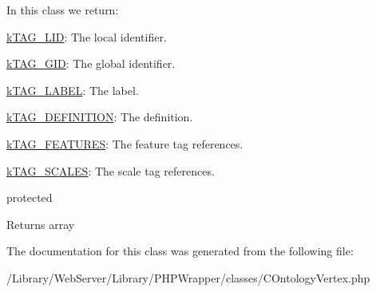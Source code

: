 In this class we return\-:


\begin{DoxyItemize}
\item {\ttfamily \hyperlink{}{k\-T\-A\-G\-\_\-\-L\-I\-D}}\-: The local identifier. 
\item {\ttfamily \hyperlink{}{k\-T\-A\-G\-\_\-\-G\-I\-D}}\-: The global identifier. 
\item {\ttfamily \hyperlink{}{k\-T\-A\-G\-\_\-\-L\-A\-B\-E\-L}}\-: The label. 
\item {\ttfamily \hyperlink{}{k\-T\-A\-G\-\_\-\-D\-E\-F\-I\-N\-I\-T\-I\-O\-N}}\-: The definition. 
\item {\ttfamily \hyperlink{}{k\-T\-A\-G\-\_\-\-F\-E\-A\-T\-U\-R\-E\-S}}\-: The feature tag references. 
\item {\ttfamily \hyperlink{}{k\-T\-A\-G\-\_\-\-S\-C\-A\-L\-E\-S}}\-: The scale tag references. 
\end{DoxyItemize}

protected \begin{DoxyReturn}{Returns}
array 
\end{DoxyReturn}


The documentation for this class was generated from the following file\-:\begin{DoxyCompactItemize}
\item 
/\-Library/\-Web\-Server/\-Library/\-P\-H\-P\-Wrapper/classes/C\-Ontology\-Vertex.\-php\end{DoxyCompactItemize}
